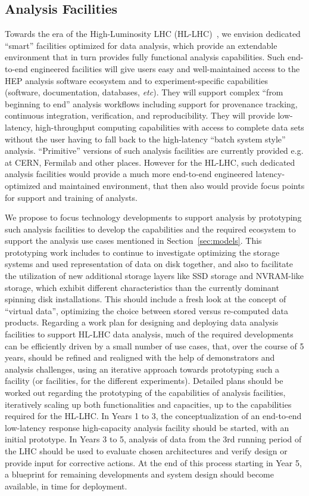 \documentclass[12pt,a4paper]{article}
\begin{document}
\subsection{Analysis Facilities} 
Towards the era of the High-Luminosity LHC (HL-LHC)~\cite{Apollinari:2284929}, we envision dedicated ``smart'' facilities optimized for data analysis, which provide an extendable environment that in turn provides fully functional analysis capabilities. Such end-to-end engineered facilities will give users easy and well-maintained access to the HEP analysis software ecosystem and to experiment-specific capabilities (software, documentation, databases, {\it etc}). They will support complex ``from beginning to end'' analysis workflows including support for provenance tracking, continuous integration, verification, and reproducibility. They will provide low-latency, high-throughput computing capabilities with access to complete data sets without the user having to fall back to the high-latency ``batch system style'' analysis. ``Primitive'' versions of such analysis facilities are currently provided e.g. at CERN, Fermilab and other places. However for the HL-LHC, such dedicated analysis facilities would provide a much more end-to-end engineered latency-optimized and maintained environment, that then also would provide focus points for support and training of analysts.

We propose to focus technology developments to support analysis by prototyping such analysis facilities to develop the capabilities and the required ecosystem to support the analysis use cases mentioned in Section~\ref{sec:models}. This prototyping work  includes to continue to investigate optimizing the storage systems and used representation of data on disk together, and also to facilitate the utilization of new additional storage layers like SSD storage and NVRAM-like storage, which exhibit different characteristics than the currently dominant spinning disk installations. This should include a fresh look at the concept of ``virtual data'', optimizing the choice between stored versus re-computed data products. Regarding a work plan for designing and deploying data analysis facilities to support HL-LHC data analysis, much of the required developments can be efficiently driven by a small number of use cases, that, over the course of 5 years, should be refined and realigned with the help of demonstrators and analysis challenges, using an iterative approach towards prototyping such a facility (or facilities, for the different experiments). Detailed plans should be worked out regarding the prototyping of the capabilities of analysis facilities, iteratively scaling up both functionalities and capacities, up to the capabilities required for the HL-LHC. In Years 1 to 3, the conceptualization of an end-to-end low-latency response high-capacity analysis facility should be started, with an initial prototype. In Years 3 to 5, analysis of data from the 3rd running period of the LHC should be used to evaluate chosen architectures and verify design or provide input for corrective actions. At the end of this process starting in Year 5, a blueprint for remaining developments and system design should become available, in time for deployment.
\end{document}
